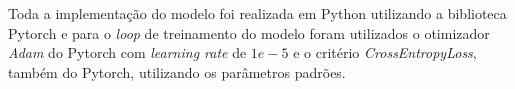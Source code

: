 Toda a implementação do modelo foi realizada em Python utilizando a biblioteca Pytorch e para o \textit{loop} de treinamento do modelo foram utilizados o otimizador \textit{Adam} do Pytorch com \textit{learning rate} de $1e-5$ e o critério \textit{CrossEntropyLoss}, também do Pytorch, utilizando os parâmetros padrões.



